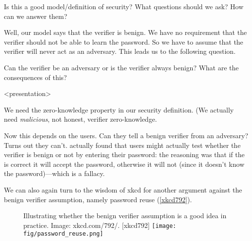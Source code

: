 \begin{frame}
  \begin{exercise}
    Is this a good model/definition of security?
    What questions should we ask?
    How can we answer them?
  \end{exercise}
\end{frame}

Well, our model says that the verifier is benign.
We have no requirement that the verifier should not be able to learn the 
password.
So we have to assume that the verifier will never act as an adversary.
This leads us to the following question.

\begin{frame}
  \begin{question}
    Can the verifier be an adversary or is the verifier always benign?
    What are the consequences of this?
  \end{question}
\end{frame}

\begin{frame}<presentation>
  \begin{example}
  \end{example}

  \pause

  \begin{example}[Consequences]
    We need the zero-knowledge property in our security definition.
    (We actually need \emph{malicious}, not honest, verifier zero-knowledge.
  \end{example}
\end{frame}

Now this depends on the users.
Can they tell a benign verifier from an adversary?
Turns out they can't\autocite{WhyPhishingWorks}.
 actually found that users might actually test 
whether the verifier is benign or not by entering their password:
the reasoning was that if the is correct it will accept the password, otherwise 
it will not (since it doesn't know the password)---which is a fallacy.

We can also again turn to the wisdom of xkcd for another argument against the 
benign verifier assumption, namely password reuse (\cref{xkcd792}).

\begin{frame}
  \begin{figure}
    \begin{sidecaption}[xkcd 792]{%
      Illustrating whether the benign verifier assumption is a good idea in 
      practice.
      Image: xkcd.com/792/.
    }[xkcd792]
      \flushscap
      \texttt{[image: fig/password\_reuse.png]}
    \end{sidecaption}
  \end{figure}
\end{frame}

